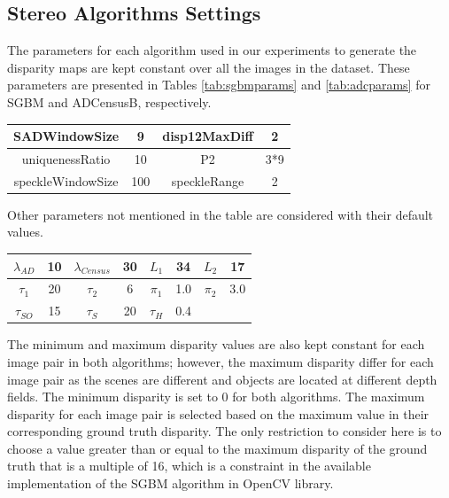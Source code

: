 \subsection{Stereo Algorithms Settings}
The parameters for each algorithm used in our experiments to generate the disparity
maps are kept constant over all the images in the dataset. These parameters are presented in Tables \ref{tab:sgbmparams} and \ref{tab:adcparams} 
for SGBM and ADCensusB, respectively. \newline

\begin{minipage}{\linewidth}
\begin{center}
\label{tab:sgbmparams}
\begin{tabular}{ |c|c|c|c|}
\hline
SADWindowSize & 9 & disp12MaxDiff & 2 \\ \hline
uniquenessRatio & 10 & P2 & 3*9 \\ \hline
speckleWindowSize & 100 & speckleRange & 2 \\ \hline
\end{tabular}
\end{center}
\end{minipage} \newline \newline

\noindent
Other parameters not mentioned in the table are considered with their default values. \newline

\begin{minipage}{\linewidth}
\begin{center}
\label{tab:adcparams}
\begin{tabular}{|c|c|c|c|c|c|c|c|}
\hline
$\lambda_{AD}$ & 10 & $\lambda_{Census}$ & 30 & $L_{1}$ & 34 & $L_{2}$ & 17 \\ \hline
$\tau_{1}$ & 20 & $\tau_{2}$ & 6 & $\pi_{1}$ & 1.0 & $\pi_{2}$ & 3.0 \\ \hline 
$\tau_{SO}$ & 15 & $\tau_{S}$ & 20 & $\tau_{H}$ & 0.4 & & \\  \hline
\end{tabular}
\end{center}
\end{minipage} \newline \newline

The minimum and maximum disparity values are also kept constant for each image pair in both algorithms; however, the maximum 
disparity differ for each image pair as the scenes are different
and objects are located at different depth fields.
The minimum disparity is set to $0$ for both algorithms. The maximum disparity for each image pair is selected based on the maximum value in their
corresponding ground truth disparity. The only restriction to consider here is to choose a value greater than or equal to 
the maximum disparity of the ground truth that is a multiple of 16, which is a constraint
in the available implementation of the SGBM algorithm in OpenCV library.


